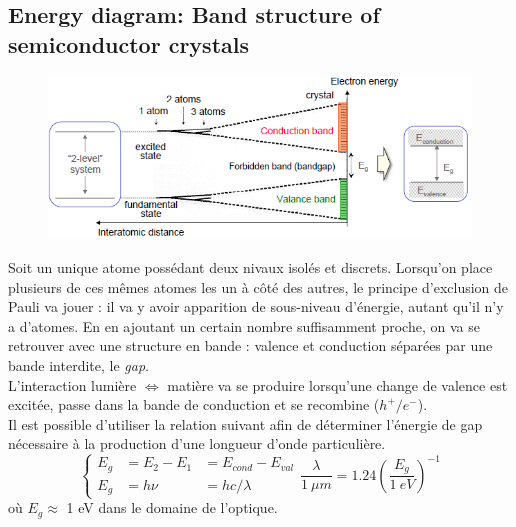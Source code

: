 \subsection{Energy diagram: Band structure of semiconductor crystals}
	\begin{figure}
	\vspace{-5mm}
	\includegraphics[scale=0.6]{ch4/image2}
	\end{figure}
Soit un unique atome possédant deux nivaux isolés et discrets. Lorsqu'on place plusieurs de ces mêmes
atomes les un à côté des autres, le principe d'exclusion de Pauli va jouer : il va y avoir apparition
de sous-niveau d'énergie, autant qu'il n'y a d'atomes. En en ajoutant un certain nombre suffisamment 
proche, on va se retrouver avec une structure en bande : valence et conduction séparées par une bande
interdite, le \textit{gap}.\\

L'interaction lumière $\Leftrightarrow$ matière va se produire lorsqu'une change de valence est 
excitée, passe dans la bande de conduction et se recombine ($h^+/e^-$).\\

Il est possible d'utiliser la relation suivant afin de déterminer l'énergie de gap nécessaire à 
la production d'une longueur d'onde particulière. 
\begin{equation}
\left\{\begin{array}{lll}
E_g &=E_2-E_1 &= E_{cond} - E_{val} \\
E_g &= h\nu &= hc/\lambda
\end{array}\right. \dfrac{\lambda}{1\ \mu m}=1.24\left(\dfrac{E_g}{1\ eV}\right)^{-1}
\end{equation}
où $E_g\approx$ 1 eV dans le domaine de l'optique.\\

